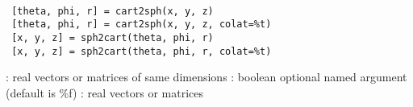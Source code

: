 
\begin{mandesc}
   \\
\end{mandesc}

\begin{calling_sequence}
\begin{verbatim}
 [theta, phi, r] = cart2sph(x, y, z)
 [theta, phi, r] = cart2sph(x, y, z, colat=%t)
 [x, y, z] = sph2cart(theta, phi, r)
 [x, y, z] = sph2cart(theta, phi, r, colat=%t)
\end{verbatim}
\end{calling_sequence}

\begin{parameters}
  \begin{varlist}
   : real vectors or matrices of same dimensions
   : boolean optional named argument (default is \%f)
   : real vectors or matrices
  \end{varlist}
\end{parameters}


